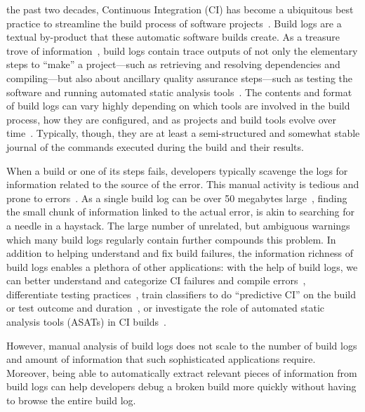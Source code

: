 \documentclass[10pt,journal,compsoc]{IEEEtran}
\begin{document}
the past two decades, Continuous Integration (CI) has become a
ubiquitous best practice to streamline the build process of software
projects~\cite{hilton2016usage,beller2017oops,staahl2014modeling}.
Build logs are a textual by-product that these automatic software
builds create.
As a treasure trove of information~\cite{meyer},
build logs contain trace outputs of not only the elementary steps to
``make'' a project---such as retrieving and resolving dependencies and
compiling---but also about ancillary quality assurance steps---such as
testing the software and running automated static analysis
tools~\cite{beller2017oops}.
The
contents and format of build logs can vary highly depending on which tools
are involved in the build process, how they are
configured, and as projects and build tools evolve over
time~\cite{staahl2014modeling}.
Typically, though, they are at least a semi-structured and
somewhat stable journal of the commands executed during the build and
their results.

When a build or one of its steps fails, developers typically scavenge
the logs for information related to the source of the error.
This
manual activity is tedious and prone to
errors~\cite{santolucito2018statically}.
As a single build log can be
over 50 megabytes large~\cite{beller2017oops}, finding the small chunk
of information linked to the actual error, is akin to
searching for a needle in a haystack.
The large number of unrelated, but ambiguous
warnings which many build
logs regularly contain further compounds this problem.
In addition to helping
understand and fix build failures, the information richness of build
logs enables a plethora of other applications: with the help of build
logs, we can better understand and categorize CI failures and compile
errors~\cite{islam2017insights,seo2014programmers}, differentiate
testing practices~\cite{orellana2017differences,vassallo2017a-tale},
train classifiers to do ``predictive CI'' on the build or test outcome
and
duration~\cite{ni2017cost,bisong2017built,haghighatkhah2018test,
machalica2019predictive},
or investigate the role of automated static analysis tools (ASATs)
in CI
builds~\cite{zampetti2017open}.

However, manual analysis of build logs does not
scale to the number of build logs and amount of information that such
sophisticated applications require.
Moreover, being able to
automatically extract relevant pieces of information from build logs
can help
developers debug a broken build more quickly without having to browse
the entire build log.
\end{document}
